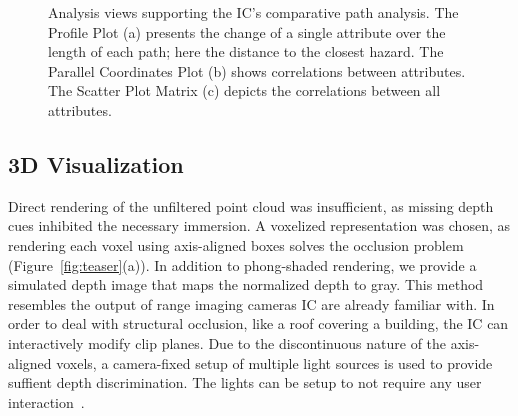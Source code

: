 \documentclass{egpubl}
\begin{document}
\begin{figure}
{	    \label{fig:overview:analysis:pcp}
	}
	\hfill
	\caption{Analysis views supporting the IC's comparative path analysis. The Profile Plot (a) presents the change of a single attribute over the length of each path; here the distance to the closest hazard. The Parallel Coordinates Plot (b) shows correlations between attributes. The Scatter Plot Matrix (c) depicts the correlations between all attributes.}
\end{figure}

\subsection{3D Visualization} \label{sec:overview:3dvisualization}
 Direct rendering of the unfiltered point cloud was insufficient, as missing depth cues inhibited the necessary immersion. A voxelized representation was chosen, as rendering each voxel using axis-aligned boxes solves the occlusion problem (Figure~\ref{fig:teaser}(a)). In addition to phong-shaded rendering, we provide a simulated depth image that maps the normalized depth to gray. This method resembles the output of range imaging cameras IC are already familiar with. In order to deal with structural occlusion, like a roof covering a building, the IC can interactively modify clip planes. Due to the discontinuous nature of the axis-aligned voxels, a camera-fixed setup of multiple light sources is used to provide suffient depth discrimination. The lights can be setup to not require any user interaction~\cite{wang2013lighting}.
\end{document}
